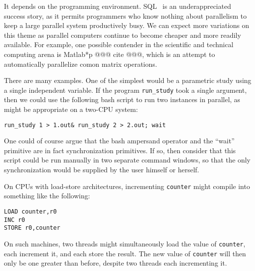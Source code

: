 
	   It depends on the programming environment.
	   SQL~\cite{DIS9075SQL92} is an underappreciated success
	   story, as it permits programmers who know nothing about parallelism
	   to keep a large parallel system productively busy.
	   We can expect more variations on this theme as parallel
	   computers continue to become cheaper and more readily available.
	   For example, one possible contender in the scientific and
	   technical computing arena is Matlab*p @@@ cite @@@,
	   which is an attempt to automatically parallelize comon
	   matrix operations.


	   There are many examples.
	   One of the simplest would be a parametric study using a
	   single independent variable.
	   If the program {\tt run\_study} took a single argument,
	   then we could use the following bash script to run two
	   instances in parallel, as might be appropriate on a
	   two-CPU system:

	   { \scriptsize \tt run\_study 1 > 1.out\& run\_study 2 > 2.out; wait}

	   One could of course argue that the bash ampersand operator and
	   the ``wait'' primitive are in fact synchronization primitives.
	   If so, then consider that 
	   this script could be run manually in two separate
	   command windows, so that the only synchronization would be
	   supplied by the user himself or herself.


	On CPUs with load-store architectures, incrementing {\tt counter}
	might compile into something like the following:

\vspace{5pt}
\begin{minipage}[t]{\columnwidth}
\small 
\begin{verbatim}
LOAD counter,r0
INC r0
STORE r0,counter
\end{verbatim}
\end{minipage} 
\vspace{5pt}

	On such machines, two threads might simultaneously load the
	value of {\tt counter}, each increment it, and each store the
	result.
	The new value of {\tt counter} will then only be one greater
	than before, despite two threads each incrementing it.

